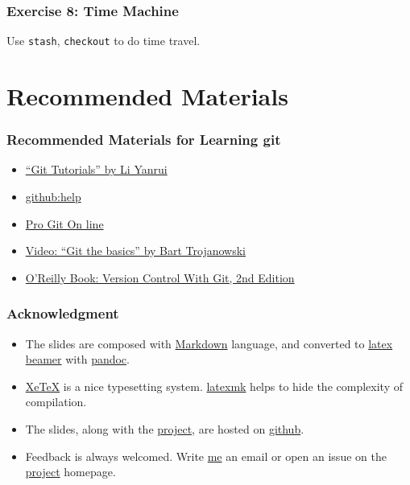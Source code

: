 \documentclass[11pt,ignorenonframetext,]{beamer}
\begin{document}
\begin{frame}[fragile]\frametitle{Exercise 8: Time Machine}

Use \texttt{stash}, \texttt{checkout} to do time travel.

\end{frame}

\section{Recommended Materials}

\begin{frame}\frametitle{Recommended Materials for Learning git}

\begin{itemize}
\item
  \href{http://goo.gl/NBGgo}{``Git Tutorials'' by Li Yanrui}
\item
  \href{http://help.github.com/}{github:help}
\item
  \href{http://progit.org/book/}{Pro Git On line}
\item
  \href{http://excess.org/article/2008/07/ogre-git-tutorial/}{Video:
  ``Git the basics'' by Bart Trojanowski}
\item
  \href{http://shop.oreilly.com/product/0636920022862.do}{O'Reilly Book:
  Version Control With Git, 2nd Edition}
\end{itemize}
\end{frame}

\begin{frame}\frametitle{Acknowledgment}

\begin{itemize}
\item
  The slides are composed with
  \href{http://daringfireball.net/projects/markdown/}{Markdown}
  language, and converted to
  \href{https://bitbucket.org/rivanvx/beamer/wiki/Home}{latex beamer}
  with \href{http://johnmacfarlane.net/pandoc/}{pandoc}.\\
\item
  \href{http://www.tug.org/xetex/}{XeTeX} is a nice typesetting system.
  \href{http://www.phys.psu.edu/~collins/software/latexmk-jcc/}{latexmk}
  helps to hide the complexity of compilation.
\item
  The slides, along with the
  \href{https://github.com/weijianwen/GitForBeginners}{project}, are
  hosted on \href{https://github.com/}{github}.
\item
  Feedback is always welcomed. Write
  \href{mailto:weijianwen@sjtu.edu.cn}{me} an email or open an issue on the
  \href{https://github.com/weijianwen/GitForBeginners}{project}
  homepage.

\end{itemize}
\end{frame}
\end{document}
